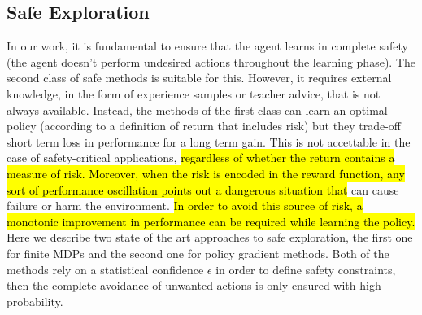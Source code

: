 \subsection{Safe Exploration} \label{subsec:safeexp}
In our work, it is fundamental to ensure that the agent learns in complete safety (\ie the agent doesn't perform undesired actions throughout the learning phase). The second class of safe methods is suitable for this. However, it requires external knowledge, in the form of experience samples or teacher advice, that is not always available. Instead, the methods of the first class can learn an optimal policy (according to a definition of return that includes risk) but they trade-off short term loss in performance for a long term gain. This is not accettable in the case of safety-critical applications, \hl{regardless of whether the return contains a measure of risk. Moreover, when the risk is encoded in the reward function, any sort of performance oscillation points out a dangerous situation that} can cause failure or harm the environment. \hl{In order to avoid this source of risk, a monotonic improvement in performance can be required while learning the policy.} Here we describe two state of the art approaches to safe exploration, the first one for finite \ac{MDPs} and the second one for policy gradient methods. Both of the methods rely on a statistical confidence $\epsilon$ in order to define safety constraints, then the complete avoidance of unwanted actions is only ensured with high probability. 


